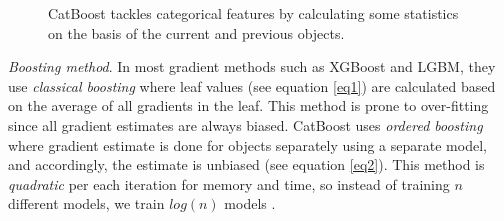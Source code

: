 \begin{figure}[htb]
	\begin{center}
		\caption[Categorical handling in CatBoost]{CatBoost tackles categorical features by calculating some statistics on the basis of the current and previous objects.}
		\label{fig:cat1}
	\end{center}
\end{figure}


\textit{Boosting method}. In most gradient methods such as XGBoost and LGBM, they use \textit{classical boosting} where leaf values (see equation \ref{eq1}) are calculated based on the average of all gradients in the leaf. This method is prone to over-fitting since all gradient estimates are always biased. CatBoost uses \textit{ordered boosting} where gradient estimate is done for objects separately using a separate model, and accordingly, the estimate is unbiased (see equation \ref{eq2}). This method is \textit{quadratic} per each iteration for memory and time, so instead of training $n$ different models, we train $log(n)$ models \cite{prokhorenkova2018catboost}.


